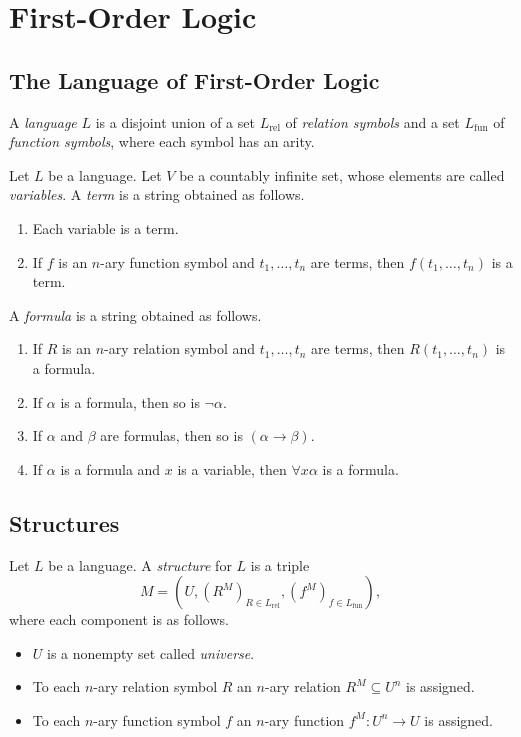 \chapter{First-Order Logic}
\section{The Language of First-Order Logic}
\begin{definition}
  A \emph{language} $L$ is a disjoint union of a set $L_\mathrm{rel}$ of
  \emph{relation symbols} and a set $L_\mathrm{fun}$ of
  \emph{function symbols}, where each symbol has an arity.
\end{definition}

\begin{definition}
  Let $L$ be a language.
  Let $V$ be a countably infinite set, whose elements are called
  \emph{variables}.
  A \emph{term} is a string obtained as follows.
  \begin{enumerate}
    \item Each variable is a term.
    \item If $f$ is an $n$-ary function symbol and $t_1, \dots, t_n$ are terms,
    then $f(t_1, \dots, t_n)$ is a term.
  \end{enumerate}
  A \emph{formula} is a string obtained as follows.
  \begin{enumerate}
    \item If $R$ is an $n$-ary relation symbol and $t_1, \dots, t_n$ are terms,
    then $R(t_1, \dots, t_n)$ is a formula.
    \item If $\alpha$ is a formula, then so is $\neg\alpha$.
    \item If $\alpha$ and $\beta$ are formulas, then so is
    $(\alpha \to \beta)$.
    \item If $\alpha$ is a formula and $x$ is a variable, then
    $\forall x \alpha$ is a formula.
  \end{enumerate}
\end{definition}

\section{Structures}
\begin{definition}
  Let $L$ be a language.
  A \emph{structure} for $L$ is a triple
  \begin{equation*}
    M =
    \left(U, (R^M)_{R \in L_\mathrm{rel}}, (f^M)_{f \in L_\mathrm{fun}}\right),
  \end{equation*}
  where each component is as follows.
  \begin{itemize}
    \item $U$ is a nonempty set called \emph{universe}.
    \item To each $n$-ary relation symbol $R$ an $n$-ary relation
    $R^M \subseteq U^n$ is assigned.
    \item To each $n$-ary function symbol $f$ an $n$-ary function
    $f^M: U^n \to U$ is assigned.
  \end{itemize}
\end{definition}

